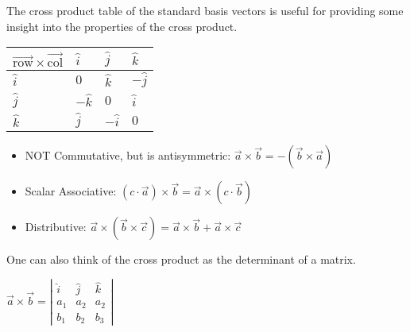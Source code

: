 \noindent
The cross product table of the standard basis vectors is useful for providing some insight into the properties of the cross product.
\begin{table}[h]
	\centering
	\begin{tabular}{|l|l|l|l|}
		\hline
		$\overrightarrow{\text{row}}\times\overrightarrow{\text{col}}$ & $\hat{i}$  & $\hat{j}$  & $\hat{k}$  \\ \hline
		$\hat{i}$                                & $0$        & $\hat{k}$  & $-\hat{j}$ \\ \hline
		$\hat{j}$                                & $-\hat{k}$ & $0$        & $\hat{i}$  \\ \hline
		$\hat{k}$                                & $\hat{j}$  & $-\hat{i}$ & $0$        \\ \hline
	\end{tabular}
\end{table}
\begin{itemize}
	\item NOT Commutative, but is antisymmetric: $\vec{a}\times\vec{b}=-\left(\vec{b}\times\vec{a}\right)$
	\item Scalar Associative: $\left(c\cdot\vec{a}\right)\times\vec{b}=\vec{a}\times\left(c\cdot\vec{b}\right)$
	\item Distributive: $\vec{a}\times\left(\vec{b}\times\vec{c}\right)=\vec{a}\times\vec{b}+\vec{a}\times\vec{c}$
\end{itemize}

\noindent
One can also think of the cross product as the determinant of a matrix.\\
\begin{center}
	$\vec{a}\times\vec{b}=\left|\begin{matrix}\hat{i}& \hat{j} & \hat{k} \\a_1 & a_2 & a_2\\b_1 & b_2 & b_3 \end{matrix}\right|$
\end{center}